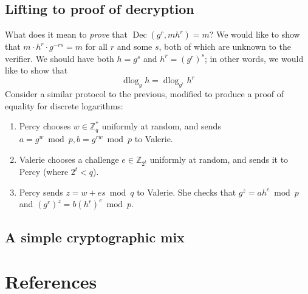 \documentclass[11pt,twoside,a4paper]{article}
\DeclareMathOperator{\Dec}{Dec}
\DeclareMathOperator{\dlog}{dlog}
\theoremstyle{definition}
\begin{document}
\subsection{Lifting to proof of decryption}
What does it mean to \textit{prove} that \(\Dec(g^r,mh^r)=m\)? We would like to show that \(m\cdot h^r\cdot g^{-rs}=m\) for all \(r\) and some \(s\), both of which are unknown to the verifier. We should have both \(h=g^s\) and \(h^r=(g^r)^s\); in other words, we would like to show that
\[\dlog_g{h}=\dlog_{g^r}{h^r}\]
Consider a similar protocol to the previous, modified to produce a proof of equality for discrete logarithms:
\begin{enumerate}
    \item Percy chooses \(w\in\mathbb{Z}^*_q\) uniformly at random, and sends \(a=g^w\bmod p,b=g^{rw}\bmod p\) to Valerie.
    \item Valerie chooses a challenge \(e\in\mathbb{Z}_{2^t}\) uniformly at random, and sends it to Percy (where \(2^t<q\)).
    \item Percy sends \(z=w+es\bmod q\) to Valerie. She checks that \(g^z=ah^e\bmod p\) and \((g^r)^z=b(h^r)^e\bmod p\).
\end{enumerate}
\subsection{A simple cryptographic mix}
\section{References}


\end{document}
